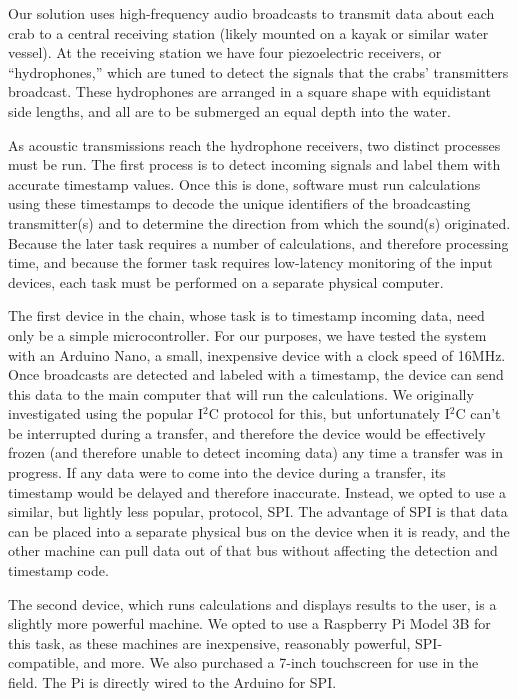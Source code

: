 \documentclass[12pt]{article}
\begin{document}
Our solution uses high-frequency audio broadcasts to transmit data about
each crab to a central receiving station (likely mounted on a kayak or similar
water vessel).
At the receiving station we have four piezoelectric receivers, or
``hydrophones,'' which are tuned to detect the signals that the crabs'
transmitters broadcast.
These hydrophones are arranged in a square shape with equidistant side
lengths, and all are to be submerged an equal depth into the water.

As acoustic transmissions reach the hydrophone receivers, two distinct
processes must be run.
The first process is to detect incoming signals and label them with accurate
timestamp values.
Once this is done, software must run calculations using these timestamps
to decode the unique identifiers of the broadcasting transmitter(s) and to
determine the direction from which the sound(s) originated.
Because the later task requires a number of calculations, and therefore
processing time,
and because the former task requires low-latency monitoring of the input
devices, each task must be performed on a separate physical computer.

The first device in the chain, whose task is to timestamp incoming data,
need only be a simple microcontroller.
For our purposes, we have tested the system with an Arduino Nano, a small,
inexpensive device with a clock speed of 16MHz.
Once broadcasts are detected and labeled with a timestamp, the device can
send this data to the main computer that will run the calculations.
We originally investigated using the popular I$^2$C protocol for this, but
unfortunately I$^2$C can't be interrupted during a transfer, and therefore
the device would be effectively frozen (and therefore unable to detect
incoming data) any time a transfer was in progress.
If any data were to come into the device during a transfer, its timestamp
would be delayed and therefore inaccurate.
Instead, we opted to use a similar, but lightly less popular, protocol, SPI.
The advantage of SPI is that data can be placed into a separate physical
bus on the device when it is ready, and the other machine can pull data out
of that bus without affecting the detection and timestamp code.

The second device, which runs calculations and displays results to the user,
is a slightly more powerful machine.
We opted to use a Raspberry Pi Model 3B for this task, as these machines are
inexpensive, reasonably powerful, SPI-compatible, and more.
We also purchased a 7-inch touchscreen for use in the field.
The Pi is directly wired to the Arduino for SPI.
\end{document}
